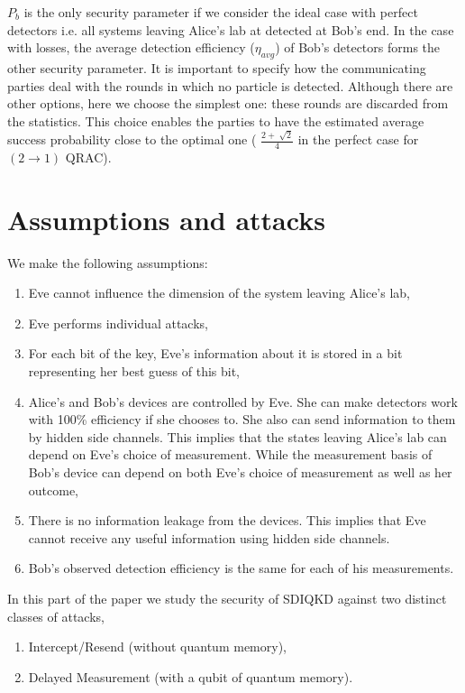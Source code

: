 \documentclass[smallextended]{svjour3}
\begin{document}
$P_b$ is the only security parameter if we consider the ideal case with perfect detectors i.e. all systems leaving Alice's lab at detected at Bob's end. In the case with losses, the average detection efficiency ($\eta_{avg}$) of Bob's detectors forms the other security parameter. It is important to specify how the communicating parties deal with the rounds in which no particle is detected. Although there are other options, here we choose the simplest one: these rounds are discarded from the statistics. This choice enables the parties to have the estimated average success probability close to the optimal one ( $\frac{2+\sqrt[]{2}}{4}$ in the perfect case for $(2\to1)$ QRAC).
\section{\label{sec:level1} Assumptions and attacks}

We make the following assumptions:
\begin{enumerate}
\item Eve cannot influence the dimension of the system leaving Alice's lab,
\item Eve performs individual attacks,
\item For each bit of the key, Eve's information about it is stored in a bit representing her best guess of this bit,
\item Alice's and Bob's devices are controlled by Eve. She can make detectors work with 100\% efficiency if she chooses to. She also can send information to them  by hidden side channels.  This implies that the states leaving Alice's lab can depend on Eve's choice of measurement. While the measurement basis of Bob's device can depend on both Eve's choice of measurement as well as her outcome,
\item There is no information leakage from the devices. This implies that Eve cannot receive any useful information using hidden side channels.
\item Bob's observed detection efficiency is the same for each of his measurements.
\end{enumerate}

In this part of the paper we study the security of SDIQKD against two distinct classes of attacks,
\begin{enumerate}
\item  Intercept/Resend (without quantum memory),
\item  Delayed Measurement (with a qubit of quantum memory).
\end{enumerate}
\end{document}
